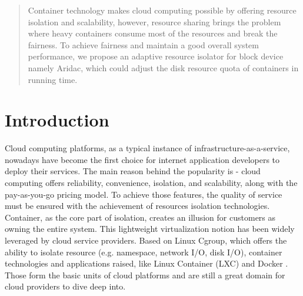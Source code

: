 \documentclass[10pt, conference,compsoc]{IEEEtran}
\begin{document}




\maketitle

\begin{abstract}
Container technology makes cloud computing possible by offering resource isolation and scalability, however, resource sharing brings the problem where heavy containers consume most of the resources and break the fairness. To achieve fairness and maintain a good overall system performance, we propose an adaptive resource isolator for block device namely Aridac, which could adjust the disk resource quota of containers in running time.
\end{abstract}





%
\IEEEpeerreviewmaketitle



\section{Introduction}
Cloud computing platforms, as a typical instance of infrastructure-as-a-service, nowadays have become the first choice for internet application developers to deploy their services. The main reason behind the popularity is - cloud computing offers reliability, convenience, isolation, and scalability, along with the pay-as-you-go pricing model. To achieve those features, the quality of service must be ensured with the achievement of resources isolation technologies.\\

Container, as the core part of isolation, creates an illusion for customers as owning the entire system. This lightweight virtualization notion has been widely leveraged by cloud service providers. Based on Linux Cgroup, which offers the ability to isolate resource (e.g. namespace, network I/O, disk I/O), container technologies and applications raised, like Linux Container (LXC) \cite{lxc} and Docker \cite{docker}. Those form the basic units of cloud platforms and are still a great domain for cloud providers to dive deep into. \\
\end{document}
